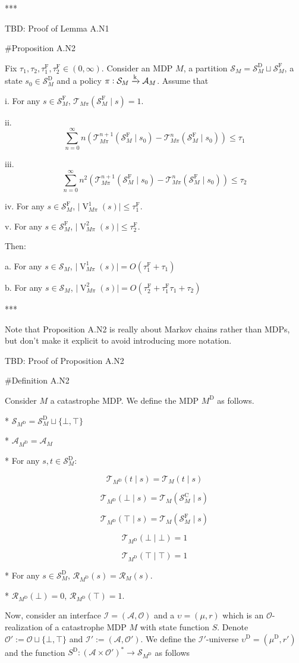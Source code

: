\documentclass[a4paper]{article}
\newcommand{\AP}[1]{\left(#1\right)}
\newcommand{\Abs}[1]{\lvert #1 \rvert}
\newcommand{\M}{\xrightarrow{\textnormal{k}}}
\newcommand{\Ob}{\mathcal{O}}
\newcommand{\A}{\mathcal{A}}
\newcommand{\St}{\mathcal{S}}
\newcommand{\T}{\mathcal{T}}
\newcommand{\R}{\mathcal{R}}
\newcommand{\In}{\mathcal{I}}
\newcommand{\RMC}{\mathrm{C}}
\newcommand{\RMD}{\mathrm{D}}
\newcommand{\RMF}{\mathrm{F}}
\newcommand{\SF}{\St^{\RMF}}
\newcommand{\SD}{\St^{\RMD}}
\newcommand{\SC}{\St^{\RMC}}
\newcommand{\MD}{M^{\RMD}}
\newcommand{\TF}{\tau^{\RMF}}
\newcommand{\UD}{\upsilon^{\RMD}}
\newcommand{\V}{\operatorname{V}}
\begin{document}
***

TBD: Proof of Lemma A.N1 %

\#Proposition A.N2

Fix $\tau_1, \tau_2, \TF_1, \TF_2 \in (0,\infty)$. Consider an MDP $M$, a partition $\St_M = \SD_M \sqcup \SF_M$, a state $s_0 \in \SD_M$ and a policy $\pi: \St_M \M \A_M$. Assume that

i. For any $s \in \SF_M$, $\T_{M\pi}\AP{\SF_M \mid s}=1$.

ii. $$\sum_{n=0}^\infty n \AP{\T_{M\pi}^{n+1}\AP{\SF_M \mid s_0}-\T_{M\pi}^{n}\AP{\SF_M \mid s_0}} \leq \tau_1$$

iii. $$\sum_{n=0}^\infty n^2 \AP{\T_{M\pi}^{n+1}\AP{\SF_M \mid s_0}-\T_{M\pi}^{n}\AP{\SF_M \mid s_0}} \leq \tau_2$$

iv. For any $s \in \SF_M$, $\Abs{\V^1_{M\pi}(s)} \leq \TF_1$.

v. For any $s \in \SF_M$, $\Abs{\V^2_{M\pi}(s)} \leq \TF_2$. 

Then:

a. For any $s \in \St_M$, $\Abs{\V^1_{M\pi}(s)} = O\AP{\TF_1 + \tau_1}$

b. For any $s \in \St_M$, $\Abs{\V^2_{M\pi}(s)} = O\AP{\TF_2 + \TF_1 \tau_1 + \tau_2}$

***

Note that Proposition A.N2 is really about Markov chains rather than MDPs, but don't make it explicit to avoid introducing more notation.

TBD: Proof of Proposition A.N2

\#Definition A.N2

Consider $M$ a catastrophe MDP. We define the MDP $\MD$ as follows.

* $\St_{\MD} = \SD_M \sqcup \{\bot,\top\}$

* $\A_{\MD} = \A_M$

* For any $s,t \in \SD_M$: 

$$\T_{\MD}(t \mid s) = \T_M(t \mid s)$$

$$\T_{\MD}(\bot \mid s) = \T_M(\SC_M \mid s)$$

$$\T_{\MD}(\top \mid s) = \T_M(\SF_M \mid s)$$

$$\T_{\MD}(\bot \mid \bot) = 1$$

$$\T_{\MD}(\top \mid \top) = 1$$

* For any $s \in \SD_M$, $\R_{\MD}(s) = \R_M(s)$.

* $\R_{\MD}(\bot) = 0$, $\R_{\MD}(\top) = 1$.

Now, consider an interface $\In=(\A,\Ob)$ and a $\upsilon=(\mu,r)$ which is an $\Ob$-realization of a catastrophe MDP $M$ with state function $S$. Denote $\Ob':=\Ob\sqcup\{\bot,\top\}$ and $\In':=(\A,\Ob')$. We define the $\In'$-universe $\UD=(\mu^\RMD,r')$ and the function $S^\RMD: \AP{\A \times \Ob'}^* \rightarrow \St_{\MD}$ as follows
\end{document}
